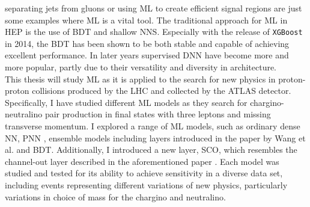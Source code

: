 separating jets from gluons \cite{PhysRevD.44.2025} or using \ac{ML} to create efficient signal regions \cite{baldi_searching_2014} are 
just some examples where \ac{ML} is a vital tool. The traditional approach for \ac{ML} in \ac{HEP} is the use of \acf{BDT} and shallow \acf{NNS}. 
Especially with the release of \verb!XGBoost! \cite{XGB} in 2014, the \ac{BDT} has been shown to be both stable and capable of achieving excellent 
performance. In later years supervised \acf{DNN} have become more and more popular, partly due to their versatility and diversity in architecture.
\newline
\\
This thesis will study \ac{ML} as it is applied to the search for new physics in proton-proton collisions produced by the \ac{LHC} and collected by 
the \acs{ATLAS} detector. Specifically, I have studied different \ac{ML} models as they search for chargino-neutralino pair production in final states 
with three leptons and missing transverse momentum. I explored a range of \ac{ML} models, such as ordinary dense \acs{NN}, \acf{PNN} \cite{PNN},
ensemble models including layers introduced in the paper by Wang et al. \cite{wang_maxout_2013} and \acl{BDT}. Additionally, I introduced a new layer, \acl{SCO}, which 
resembles the channel-out layer described in the aforementioned paper \cite{wang_maxout_2013}. Each model was studied and tested for its ability to achieve sensitivity in a 
diverse data set, including events representing different variations of new physics, particularly variations in choice of mass for the chargino and neutralino.
\newpage
